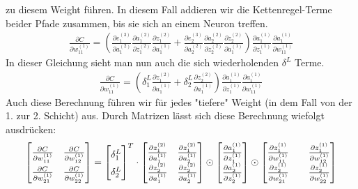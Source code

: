 zu diesem Weight führen. In diesem Fall addieren wir die Kettenregel-Terme beider Pfade zusammen, bis sie sich an einem Neuron treffen.
\begin{align*}  
  \frac{\partial C}{\partial w_{11}^{(1)}} = (\frac{\partial e_1^{(3)}}{\partial a_1^{(2)}}\frac{\partial a_1^{(2)}}{\partial z_1^{(2)}}\frac{\partial z_1^{(2)}}{\partial a_1^{(1)}} + \frac{\partial e_2^{(3)}}{\partial a_2^{(2)}}\frac{\partial a_2^{(2)}}{\partial z_2^{(2)}}\frac{\partial z_2^{(2)}}{\partial a_1^{(1)}})
  \frac{\partial a_1^{(1)}}{\partial z_1^{(1)}}\frac{\partial a_1^{(1)}}{\partial w_{11}^{(1)}}
\end{align*}
In dieser Gleichung sieht man nun auch die sich wiederholenden $\delta^{L}$ Terme.
\begin{align*}  
  \frac{\partial C}{\partial w_{11}^{(1)}} = (\delta_1^{L}\frac{\partial z_1^{(2)}}{\partial a_1^{(1)}} + \delta_2^{L}\frac{\partial z_2^{(2)}}{\partial a_1^{(1)}})
  \frac{\partial a_1^{(1)}}{\partial z_1^{(1)}}\frac{\partial a_1^{(1)}}{\partial w_{11}^{(1)}}
\end{align*}
\noindent
Auch diese Berechnung führen wir für jedes "tiefere" Weight (in dem Fall von der 1. zur 2. Schicht) aus. Durch Matrizen lässt sich diese Berechnung wiefolgt ausdrücken: 
\begin{align*}
  \renewcommand{\arraystretch}{1.5}
  \begin{bmatrix}
    \frac{\partial C}{\partial w_{11}^{(1)}} & \frac{\partial C}{\partial w_{12}^{(1)}} \\
    \frac{\partial C}{\partial w_{21}^{(1)}} & \frac{\partial C}{\partial w_{22}^{(1)}}
  \end{bmatrix} = \begin{bmatrix}
   \delta_1^L \\
   \delta_2^L
  \end{bmatrix}^T \cdot  
  \begin{bmatrix}
    \frac{\partial z_1^{(2)}}{\partial a_1^{(1)}} & \frac{\partial z_1^{(2)}}{\partial a_2^{(1)}}\\
    \frac{\partial z_2^{(2)}}{\partial a_1^{(1)}} & \frac{\partial z_2^{(2)}}{\partial a_2^{(1)}}
  \end{bmatrix} \odot 
  \begin{bmatrix}
    \frac{\partial a_1^{(1)}}{\partial z_1^{(1)}} \\
    \frac{\partial a_2^{(1)}}{\partial z_2^{(1)}}
  \end{bmatrix} \odot
  \begin{bmatrix}
   \frac{\partial z_1^{(1)}}{\partial w_{11}^{(1)}} && \frac{\partial z_1^{(1)}}{\partial w_{12}^{(1)}}\\
   \frac{\partial z_2^{(1)}}{\partial w_{21}^{(1)}} && \frac{\partial z_2^{(1)}}{\partial w_{22}^{(1)}}
  \end{bmatrix}
  \renewcommand{\arraystretch}{1.0}
\end{align*}
